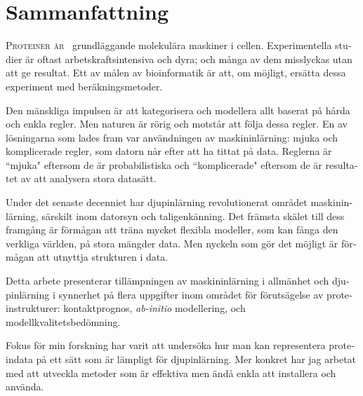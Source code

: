 \chapter*{Sammanfattning}
\begin{otherlanguage}{swedish}
\lettrine[lines=3, lhang=0.25, nindent=0em, findent=2pt]{\color{Maroon}P}{roteiner är\ } grundläggande molekulära maskiner i cellen. Experimentella studier är oftast arbetskraftsintensiva och dyra; och många av dem misslyckas utan att ge resultat. Ett av målen av bioinformatik är att, om möjligt, ersätta dessa experiment med beräkningsmetoder.

Den mänskliga impulsen är att kategorisera och modellera allt baserat på hårda och enkla regler.
Men naturen är rörig och motstår att följa dessa regler.
En av lösningarna som lades fram var användningen av maskininlärning: mjuka och komplicerade regler, som datorn når efter att ha tittat på data.
Reglerna är ``mjuka" eftersom de är probabilistiska och ``komplicerade" eftersom de är resultatet av att analysera stora datasätt.

Under det senaste decenniet har djupinlärning revolutionerat området maskininlärning, särskilt inom datorsyn och taligenkänning. Det främsta skälet till dess framgång är förmågan att träna mycket flexibla modeller, som kan fånga den verkliga världen, på stora mängder data. Men nyckeln som gör det möjligt är förmågan att utnyttja strukturen i data.

Detta arbete presenterar tillämpningen av maskininlärning i allmänhet och djupinlärning i synnerhet på flera uppgifter inom området för förutsägelse av proteinstrukturer: kontaktprognos, \emph{ab-initio} modellering, och modellkvalitetsbedömning.

Fokus för min forskning har varit att undersöka hur man kan representera proteindata på ett sätt som är lämpligt för djupinlärning. Mer konkret har jag arbetat med att utveckla metoder som är effektiva men ändå enkla att installera och använda.
\end{otherlanguage}